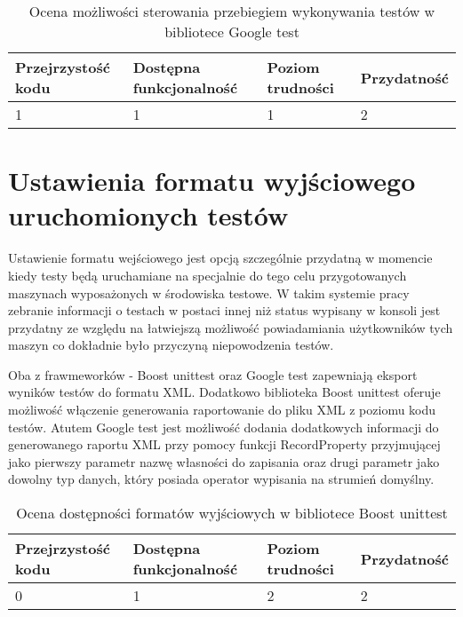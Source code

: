 \documentclass[12pt,a4paper,notitlepage]{report}
\begin{document}
\begin{center}
			\begin{table}[!ht]
			\caption{Ocena możliwości sterowania przebiegiem wykonywania testów w bibliotece Google test}
			\label{}
			\begin{tabular}[!hc]{|l|l|l|l|}
		\hline
		Przejrzystość kodu 	&	Dostępna funkcjonalność	&	Poziom trudności	&	Przydatność \\ \hline
		1					&	1						&	1					& 	2  			\\ \hline
			\end{tabular}
			\end{table} 
		\end{center}

\section{Ustawienia formatu wyjściowego uruchomionych testów}

Ustawienie formatu wejściowego jest opcją szczególnie przydatną w momencie kiedy testy będą uruchamiane na specjalnie do tego celu przygotowanych maszynach wyposażonych w środowiska testowe. W takim systemie pracy zebranie informacji o testach w postaci innej niż status wypisany w konsoli jest przydatny ze względu na łatwiejszą możliwość powiadamiania użytkowników tych maszyn co dokładnie było przyczyną niepowodzenia testów.

Oba z frawmeworków - Boost unittest oraz Google test zapewniają eksport wyników testów do formatu XML. Dodatkowo biblioteka Boost unittest oferuje możliwość włączenie generowania raportowanie do pliku XML z poziomu kodu testów. Atutem Google test jest możliwość dodania dodatkowych informacji do generowanego raportu XML przy pomocy funkcji RecordProperty przyjmującej jako pierwszy parametr nazwę własności do zapisania oraz drugi parametr jako dowolny typ danych, który posiada operator wypisania na strumień domyślny.

\begin{center}
			\begin{table}[!ht]
			\caption{Ocena dostępności formatów wyjściowych w bibliotece Boost unittest}
			\label{}
			\begin{tabular}[!hc]{|l|l|l|l|}
		\hline
		Przejrzystość kodu 	&	Dostępna funkcjonalność	&	Poziom trudności	&	Przydatność \\ \hline
		0					&	1						&	2					& 	2  			\\ \hline
			\end{tabular}
			\end{table} 
		\end{center}
\end{document}
